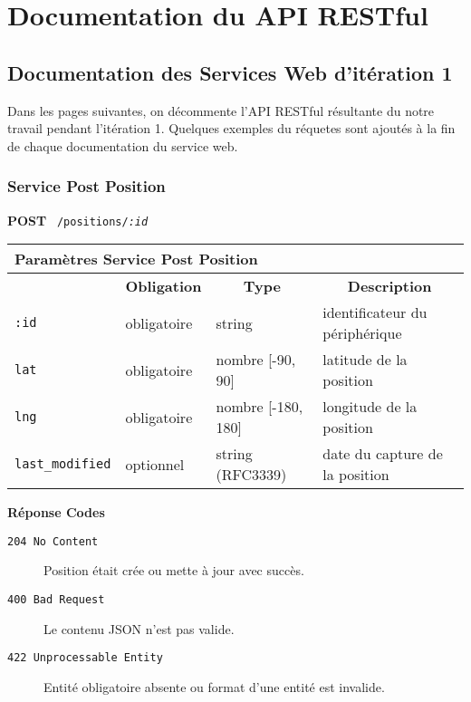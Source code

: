 \chapter{Documentation du API RESTful}

\setlength{\aboverulesep}{0pt}
\setlength{\belowrulesep}{0pt}

\section{Documentation des Services Web d'itération 1}

Dans les pages suivantes, on décommente l'API RESTful résultante du notre
travail pendant l'itération 1. Quelques exemples du réquetes sont ajoutés à la
fin de chaque documentation du service web.

\clearpage
\subsection{Service Post Position}
\label{appendix:sprint1-position-post-doc}

\textbf{POST} \ \texttt{/positions/\textit{:id}}

\begin{table}[htbp]
    \centering
    \begin{tabularx}{\textwidth}{llll}
        \multicolumn{4}{X}{\textbf{Paramètres Service Post Position}} \\
        \toprule
        \rowcolor{gray!20}
        \multicolumn{1}{c}{\textbf{Élément}} &
        \multicolumn{1}{c}{\textbf{Obligation}} &
        \multicolumn{1}{c}{\textbf{Type}} &
        \multicolumn{1}{c}{\textbf{Description}} \\
        \midrule
        \verb|:id| & obligatoire & string & identificateur du périphérique \\
        \verb|lat| & obligatoire & nombre [-90, 90] & latitude de la position \\
        \verb|lng| & obligatoire & nombre [-180, 180] & longitude de la position \\
        \verb|last_modified| & optionnel & string (RFC3339) & date du capture de la position \\
        \bottomrule
    \end{tabularx}
\end{table}

\textbf{Réponse Codes}

\begin{description}
    \item[\texttt{204 No Content}] Position était crée ou mette à jour avec succès.
    \item[\texttt{400 Bad Request}] Le contenu JSON n'est pas valide.
    \item[\texttt{422 Unprocessable Entity}] Entité obligatoire absente ou format d'une entité est invalide.
\end{description}

